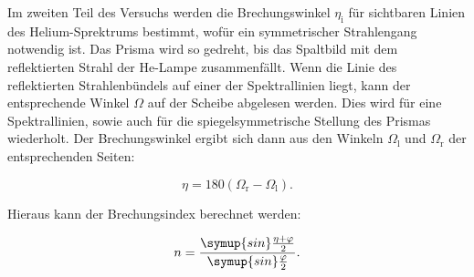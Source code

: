 Im zweiten Teil des Versuchs werden die Brechungswinkel $\eta_{\text{i}}$ für sichtbaren Linien des Helium-Sprektrums bestimmt, wofür ein symmetrischer Strahlengang notwendig ist. Das Prisma wird so gedreht, bis das Spaltbild mit dem reflektierten 
Strahl der He-Lampe zusammenfällt. Wenn die Linie des reflektierten Strahlenbündels auf einer der Spektrallinien liegt, kann der entsprechende Winkel $\Omega$ auf der Scheibe abgelesen werden. Dies wird für eine Spektrallinien, sowie auch für die spiegelsymmetrische
Stellung des Prismas wiederholt. Der Brechungswinkel ergibt sich dann aus den Winkeln $\Omega_{\text{l}}$ und $\Omega_{\text{r}}$ der entsprechenden Seiten:

\begin{equation}
\label{eq:omega}
\eta = 180 (\Omega_{\text{r}} - \Omega_{\text{l}}).
\end{equation}

Hieraus kann der Brechungsindex berechnet werden:

\begin{equation}
\label{eq:brechung}
n = \frac{\symup{sin}\frac{\eta + \varphi}{2}}{\symup{sin}\frac{\varphi}{2}}.
\end{equation}